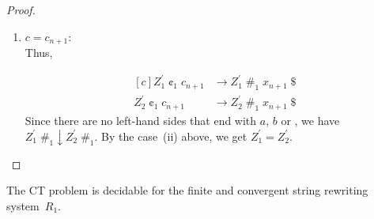 \documentclass{lmcs} %
\theoremstyle{plain}\newtheorem{satz}[thm]{Satz} %
\newcommand{\ignore}[1]{}
\begin{document}
\begin{appendices}
\begin{proof}
\begin{enumerate}[label=\roman*.]
  \item $c = c_{n+1}$:\\
  Thus,
  \ignore{The similar construction to the case~(i) above, such that $\cent_1$ will be changed with $\#_1$ and $\$$ on the right-hand side of the reduction:
         }
  \begin{equation}
	\begin{aligned}[c]
		{Z_1^{\prime}}\;\cent_1\;c_{n+1} &\rightarrow {Z_1^{\prime}}\; \#_1 \;x_{n+1}\;\$  \\
		{Z_2^{\prime}}\;\cent_1\;c_{n+1} &\rightarrow {Z_2^{\prime}}\; \#_1 \;x_{n+1}\;\$
	\end{aligned}
  \end{equation}
  Since there are no left-hand sides that end with $a$, $b$
  or {\textdollar}, we have ${Z_1^{\prime}}\; \#_1 \downarrow {Z_2^{\prime}}\; \#_1$.
  By the case~(ii) above, we get ${Z_1^{\prime}} = {Z_2^{\prime}}$. \qedhere
  \end{enumerate}    
\end{proof}

\begin{thm}
The CT problem is decidable for the finite and convergent string rewriting system~$R_1^{}$.
\end{thm}

\end{appendices}
\end{document}
